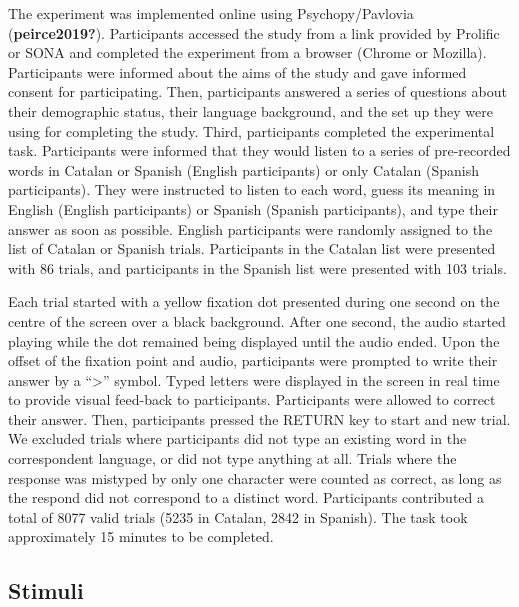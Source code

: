 \documentclass[
  english,
  man]{apa6}
\begin{document}
The experiment was implemented online using Psychopy/Pavlovia (\textbf{peirce2019?}). Participants accessed the study from a link provided by Prolific or SONA and completed the experiment from a browser (Chrome or Mozilla). Participants were informed about the aims of the study and gave informed consent for participating. Then, participants answered a series of questions about their demographic status, their language background, and the set up they were using for completing the study. Third, participants completed the experimental task. Participants were informed that they would listen to a series of pre-recorded words in Catalan or Spanish (English participants) or only Catalan (Spanish participants). They were instructed to listen to each word, guess its meaning in English (English participants) or Spanish (Spanish participants), and type their answer as soon as possible. English participants were randomly assigned to the list of Catalan or Spanish trials. Participants in the Catalan list were presented with 86 trials, and participants in the Spanish list were presented with 103 trials.

Each trial started with a yellow fixation dot presented during one second on the centre of the screen over a black background. After one second, the audio started playing while the dot remained being displayed until the audio ended. Upon the offset of the fixation point and audio, participants were prompted to write their answer by a ``\textgreater{}'' symbol. Typed letters were displayed in the screen in real time to provide visual feed-back to participants. Participants were allowed to correct their answer. Then, participants pressed the RETURN key to start and new trial. We excluded trials where participants did not type an existing word in the correspondent language, or did not type anything at all. Trials where the response was mistyped by only one character were counted as correct, as long as the respond did not correspond to a distinct word. Participants contributed a total of 8077 valid trials (5235 in Catalan, 2842 in Spanish). The task took approximately 15 minutes to be completed.

\hypertarget{stimuli}{%
\subsection{Stimuli}\label{stimuli}}
\end{document}
